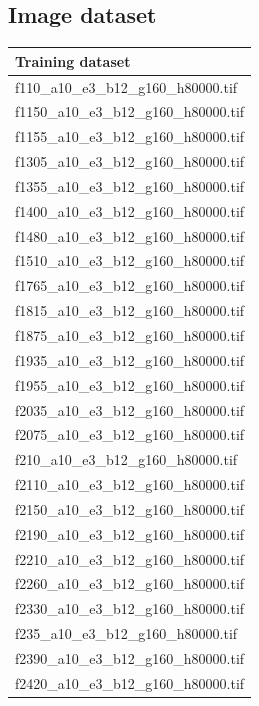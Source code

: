 \documentclass[12pt, twoside]{article}
\begin{document}
\begin{appendices}
	\subsection{Image dataset}
	\begin{longtable}{|l|}
			\hline
			Training dataset \\ \hline
			f110\_a10\_e3\_b12\_g160\_h80000.tif \\ \hline 
			f1150\_a10\_e3\_b12\_g160\_h80000.tif \\ \hline 
			f1155\_a10\_e3\_b12\_g160\_h80000.tif \\ \hline 
			f1305\_a10\_e3\_b12\_g160\_h80000.tif \\ \hline 
			f1355\_a10\_e3\_b12\_g160\_h80000.tif \\ \hline 
			f1400\_a10\_e3\_b12\_g160\_h80000.tif \\ \hline 
			f1480\_a10\_e3\_b12\_g160\_h80000.tif \\ \hline 
			f1510\_a10\_e3\_b12\_g160\_h80000.tif \\ \hline 
			f1765\_a10\_e3\_b12\_g160\_h80000.tif \\ \hline 
			f1815\_a10\_e3\_b12\_g160\_h80000.tif \\ \hline 
			f1875\_a10\_e3\_b12\_g160\_h80000.tif \\ \hline 
			f1935\_a10\_e3\_b12\_g160\_h80000.tif \\ \hline 
			f1955\_a10\_e3\_b12\_g160\_h80000.tif \\ \hline 
			f2035\_a10\_e3\_b12\_g160\_h80000.tif \\ \hline 
			f2075\_a10\_e3\_b12\_g160\_h80000.tif \\ \hline 
			f210\_a10\_e3\_b12\_g160\_h80000.tif \\ \hline 
			f2110\_a10\_e3\_b12\_g160\_h80000.tif \\ \hline 
			f2150\_a10\_e3\_b12\_g160\_h80000.tif \\ \hline 
			f2190\_a10\_e3\_b12\_g160\_h80000.tif \\ \hline 
			f2210\_a10\_e3\_b12\_g160\_h80000.tif \\ \hline 
			f2260\_a10\_e3\_b12\_g160\_h80000.tif \\ \hline 
			f2330\_a10\_e3\_b12\_g160\_h80000.tif \\ \hline 
			f235\_a10\_e3\_b12\_g160\_h80000.tif \\ \hline 
			f2390\_a10\_e3\_b12\_g160\_h80000.tif \\ \hline 
			f2420\_a10\_e3\_b12\_g160\_h80000.tif \\ \hline 

\end{longtable}
\end{appendices}
\end{document}
